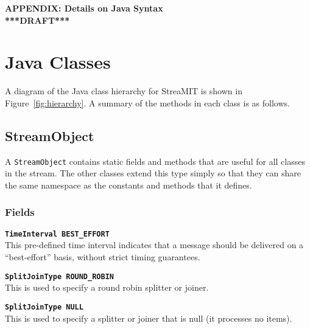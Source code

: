\clearpage

\newcommand{\doc}[1]{{\bf {\tt #1}} \vspace{3pt} \\}

\renewcommand{\theequation}{A-\arabic{equation}}
\setcounter{equation}{0}  %
\setcounter{section}{0}

\begin{center}
{\bf APPENDIX:  Details on Java Syntax \\ ***DRAFT***}
\end{center}

\section{Java Classes}

%

A diagram of the Java class hierarchy for StreaMIT is shown in
Figure~\ref{fig:hierarchy}.  A summary of the methods in each class is
as follows.

\subsection{StreamObject}

A {\tt StreamObject} contains static fields and methods that are
useful for all classes in the stream.  The other classes extend this
type simply so that they can share the same namespace as the constants
and methods that it defines.

\subsubsection{Fields}

\doc{TimeInterval BEST\_EFFORT}  This pre-defined time interval
indicates that a message should be delivered on a ``best-effort''
basis, without strict timing guarantees.

\doc{SplitJoinType ROUND\_ROBIN}  This is used to specify a round robin splitter or joiner.

\doc{SplitJoinType NULL}  This is used to specify a splitter or joiner
that is null (it processes no items).

